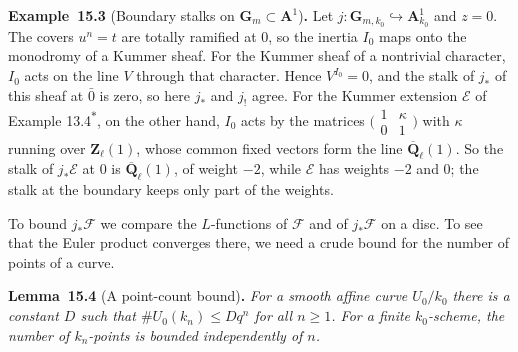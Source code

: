 \documentclass[11pt]{article}
\newenvironment{bpstatement}[2]{\par\addvspace{0.6\baselineskip}\noindent\textbf{#1}#2\textbf{.}\enspace\ignorespaces}
  {\par\addvspace{0.4\baselineskip}}
\newenvironment{bpstatementit}[2]{\begin{bpstatement}{#1}{#2}\itshape\ignorespaces}{\end{bpstatement}}
\newcommand{\bpout}[1]{#1\textsuperscript{\hyperlink{bp-outside}{\ensuremath{\ast}}}}
\begin{document}
\label{bp8}%
\begin{bpstatement}{Example~15.3}{ (Boundary stalks on $\mathbf G_m\subset\mathbf A^1$)}
Let \(j:\mathbf G_{m,k_0}\hookrightarrow\mathbf A^1_{k_0}\) and \(z=0\). The covers \(u^n=t\) are totally ramified at \(0\), so the inertia \(I_0\) maps onto the monodromy of a Kummer sheaf. For the Kummer sheaf of a nontrivial character, \(I_0\) acts on the line \(V\) through that character. Hence \(V^{I_0}=0\), and the stalk of \(j_*\) of this sheaf at \(\bar0\) is zero, so here \(j_*\) and \(j_!\) agree. For the Kummer extension \(\mathcal E\) of Example \bpout{13.4}, on the other hand, \(I_0\) acts by the matrices \(\bigl(\begin{smallmatrix}1&\kappa\\0&1\end{smallmatrix}\bigr)\) with \(\kappa\) running over \(\mathbf Z_\ell(1)\), whose common fixed vectors form the line \(\overline{\mathbf Q}_\ell(1)\). So the stalk of \(j_*\mathcal E\) at \(0\) is \(\overline{\mathbf Q}_\ell(1)\), of weight \(-2\), while \(\mathcal E\) has weights \(-2\) and \(0\); the stalk at the boundary keeps only part of the weights.
\end{bpstatement}

\label{bp9}%
To bound \(j_*\mathcal F\) we compare the \(L\)-functions of \(\mathcal F\) and of \(j_*\mathcal F\) on a disc. To see that the Euler product converges there, we need a crude bound for the number of points of a curve.

\label{bp10}%
\begin{bpstatementit}{Lemma~15.4}{ (A point-count bound)}
For a smooth affine curve \(U_0/k_0\) there is a constant \(D\) such that \(\#U_0(k_n)\le Dq^n\) for all \(n\ge1\).  For a finite \(k_0\)-scheme, the number of \(k_n\)-points is bounded independently of \(n\).
\end{bpstatementit}
\end{document}
